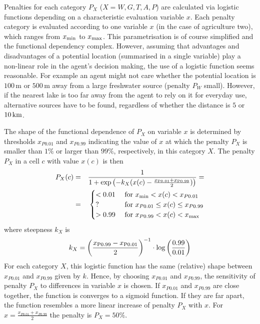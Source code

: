 Penalties for each category $P_X$ ($X={W,G,T,A,P}$) are calculated via logistic functions depending on a characteristic evaluation variable $x$.
Each penalty category is evaluated according to one variable $x$ (in the case of agriculture two), which ranges from $x_{\rm min}$ to $x_{\rm max}$.
This parametrisation is of course simplified and the functional dependency complex.
However, assuming that advantages and disadvantages of a potential location (summarised in a single variable) play a non-linear role in the agent's decision making, the use of a logistic function seems reasonable.
For example an agent might not care whether the potential location is $100\, \text{m}$ or $500\, \text{m}$ away from a large freshwater source (penalty $P_W$ small). 
However, if the nearest lake is too far away from the agent to rely on it for everyday use, alternative sources have to be found, regardless of whether the distance is $5$ or $10\, {\rm km}$.

The shape of the functional dependence of $P_X$ on variable $x$ is determined by thresholds $x_{P0.01}$ and $x_{P0.99}$ indicating the value of $x$ at which the penalty $P_X$ is smaller than $1\%$ or larger than $99\%$, respectively, in this category $X$.
The penalty $P_X$ in a cell $c$ with value $x(c)$ is then
\begin{eqnarray}\label{eq:P_X(c)}
	P_X(c) & = & \frac{1}{1+\exp\left( - k_X (x(c)-\frac{x_{\rm P0.01}+x_{\rm P0.99}}{2}) \right)} = \\
		& = & \begin{cases}
	<0.01  & \text{ for }x_{\rm min}<x(c)<x_{P0.01} \\
	\text{?}  & \text{ for } x_{P0.01}\leq x(c) \leq x_{P0.99} \\
	>0.99  & \text{ for }x_{P0.99}<x(c) < x_{\rm max} \\	
	\end{cases}
\end{eqnarray}
where steepness $k_X$ is 
\begin{equation}\label{eq:k}
k_X = \left(\frac{x_{\rm P0.99}-{x_{\rm P0.01}}}{2}\right)^{-1} \cdot \log\left(\frac{0.99}{0.01}\right)
\end{equation}
For each category $X$, this logistic function has the same (relative) shape between $x_{P0.01}$ and $x_{P0.99}$ given by $k$. 
Hence, by choosing $x_{P0.01}$ and $x_{P0.99}$, the sensitivity of penalty $P_X$ to differences in variable $x$ is chosen. 
If $x_{P0.01}$ and $x_{P0.99}$ are close together, the function is converges to a sigmoid function. 
If they are far apart, the function resembles a more linear increase of penalty $P_X$ with $x$.
For $x=\frac{x_{P0.01} + x_{P0.99}}{2}$ the penalty is $P_X = 50\%$.

